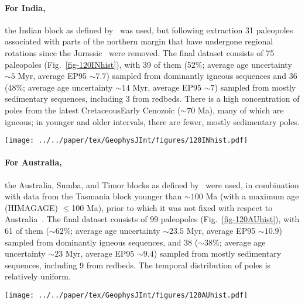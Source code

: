 \paragraph{For India,}
the Indian block as defined by~\citet{Y18} was used, but following extraction 31
paleopoles associated with parts of the northern margin that have undergone
regional rotations since the Jurassic~\citep{G15} were removed. The final
dataset consists of 75 paleopoles (Fig.~\ref{fig-120INhist}), with 39 of them
(52\%; average age uncertainty ${\sim}5$ Myr, average EP95 ${\sim}7.7$\degree)
sampled from dominantly igneous sequences and 36 (48\%; average age uncertainty
${\sim}14$ Myr, average EP95 ${\sim}7$\degree) sampled from mostly sedimentary
sequences, including 3 from redbeds. There is a high concentration of poles from
the latest Cretaceous\textendash{}Early Cenozoic (${\sim}70$ Ma),
many of which are igneous; in younger and older intervals, there are fewer,
mostly sedimentary poles.

\begin{figure*}
\centering
\texttt{[image: ../../paper/tex/GeophysJInt/figures/120INhist.pdf]}
\caption[Distribution of 120 Ma Indian poles]{Temporal distribution
of 120 Ma Indian paleopoles. For red bars, only one pole,
67 Ma (RESULTNO 8593), is from igneous and also sedimentary. See
Fig.~\ref{fig-120NAhist} for more information.}\label{fig-120INhist}
\end{figure*}

\paragraph{For Australia,}
the Australia, Sumba, and Timor blocks as defined by~\citet{Y18} were used, in
combination with data from the Tasmania block younger than ${\sim}100$ Ma (with
a maximum age (HIMAGAGE) $\leq$100 Ma), prior to which it was not fixed with
respect to Australia~\citep{Y18}. The final dataset consists of 99 paleopoles
(Fig.~\ref{fig-120AUhist}), with 61 of them (${\sim}62$\%; average age
uncertainty ${\sim}23.5$ Myr, average EP95 ${\sim}10.9$\degree) sampled from
dominantly igneous sequences, and 38 (${\sim}38$\%; average age uncertainty
${\sim}23$ Myr, average EP95 ${\sim}9.4$\degree) sampled from mostly sedimentary
sequences, including 9 from redbeds. The temporal distribution of poles is
relatively uniform.

\begin{figure*}
\centering
\texttt{[image: ../../paper/tex/GeophysJInt/figures/120AUhist.pdf]}
\caption[Distribution of 120 Ma Australian poles]{Temporal
distribution of 120 Ma Australian paleopoles. For black bars,
only four poles, 100 Ma (RESULTNO 1106), 10 Ma
(RESULTNO 1208), 4 Ma (RESULTNO 140) and 1 Ma (RESULTNO
1963), are from sedimentary and also igneous. For red bars, only one pole,
65 Ma (RESULTNO 1872), is from igneous and also sedimentary rocks,
and only one pole, 1 Ma (RESULTNO 1147), is from igneous and also
metamorphic rocks. See Fig.~\ref{fig-120NAhist} for more
information.}\label{fig-120AUhist}
\end{figure*}

